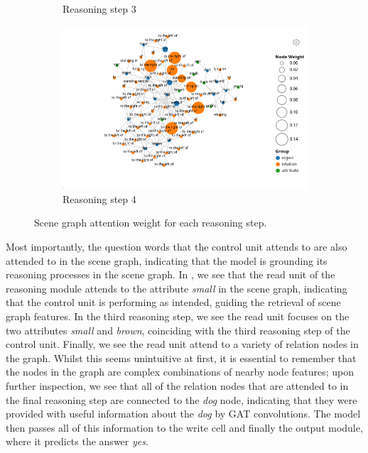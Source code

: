 \begin{figure}[htbp]
\begin{subfigure}[l]{0.49\textwidth}
        \caption{Reasoning step 3}
    \end{subfigure}
    \begin{subfigure}[r]{0.49\textwidth}
        \includegraphics[width=\textwidth]{figures/positive_logical/positive_logical_read_attn_3.png}
        \caption{Reasoning step 4}
    \end{subfigure}
    \caption[Scene graph attention weight for each reasoning step.]{Scene graph attention weight for each reasoning step.}
    \label{fig:positive_logical_read_attn}
\end{figure}

Most importantly, the question words that the control unit attends to are also attended to in the scene graph, indicating that the model is grounding its reasoning processes in the scene graph. In \figureautorefname{ \ref{fig:positive_logical_read_attn}}, we see that the read unit of the reasoning module attends to the attribute \textit{small} in the scene graph, indicating that the control unit is performing as intended, guiding the retrieval of scene graph features. In the third reasoning step, we see the read unit focuses on the two attributes \textit{small} and \textit{brown}, coinciding with the third reasoning step of the control unit. Finally, we see the read unit attend to a variety of relation nodes in the graph. Whilst this seems unintuitive at first, it is essential to remember that the nodes in the graph are complex combinations of nearby node features; upon further inspection, we see that all of the relation nodes that are attended to in the final reasoning step are connected to the \textit{dog} node, indicating that they were provided with useful information about the \textit{dog} by GAT convolutions. The model then passes all of this information to the write cell and finally the output module, where it predicts the answer \textit{yes}.

